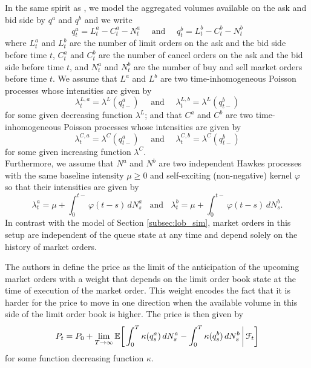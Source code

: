 \documentclass{article} %
\newcommand{\1}{\mathbbm{1}} %
\newcommand{\E}{\mathbb{E}}
\begin{document}
In the same spirit as \cite{Chahdi2024}, we  model the aggregated volumes available on the ask and bid side by $q^a$ and $q^b$ and we write
\begin{equation}
\label{eq:queue_dynamics}
q^a_t = L^{a}_t - C^{a}_t - N^{a}_t \quad \text{ and } \quad q^b_t = L^{b}_t - C^{b}_t - N^{b}_t
\end{equation}
where $L^a_t$ and $L^b_t$ are the number of limit orders on the ask and the bid side before time $t$, $C^a_t$ and $C^b_t$ are the number of cancel orders on the ask and the bid side before time $t$, and $N^a_t$ and $N^b_t$ are the number of buy and sell market orders before time $t$. We assume that $L^{a}$ and $L^{b}$ are two time-inhomogeneous Poisson processes whose intensities are given by 
\begin{equation*}
\lambda_t^{L,a} = \lambda^L(q_{t-}^{a})
\quad \text{ and } \quad 
\lambda_t^{L,b} = \lambda^L(q_{t-}^{b})
\end{equation*}
for some given decreasing function $\lambda^L$; and that $C^{a}$ and $C^{b}$ are two time-inhomogeneous Poisson processes whose intensities are given by 
\begin{equation*}
\lambda_t^{C,a} = \lambda^C(q_{t-}^{a})
\quad \text{ and } \quad 
\lambda_t^{C,b} = \lambda^C(q_{t-}^{b})
\end{equation*}
for some given increasing function $\lambda^C$.\\
Furthermore,  we assume that $N^a$ and $N^b$ are two independent Hawkes processes with the same baseline intensity $\mu \geq 0$ and self-exciting (non-negative) kernel $\varphi$ so that their intensities are given by
\begin{equation*}
\lambda^{a}_t = \mu + \int_0^{t-} \varphi(t-s) \, dN^{a}_s
\;\;\text{ and }\;\;
\lambda^{b}_t = \mu + \int_0^{t-} \varphi(t-s) \, dN^{b}_s.
\end{equation*}
In contrast with the model of Section \ref{subsec:lob_sim}, market orders in this setup are independent of the queue state at any time and depend solely on the history of market orders.

The authors in \cite{youssef2024passiveimpact} define the price as the limit of the anticipation of the upcoming market orders with a weight that depends on the limit order book state at the time of execution of the market order. This weight encodes the fact that it is harder for the price to move in one direction when the available volume in this side of the limit order book is higher. The price is then given by
\begin{equation}
\label{eq:price}
P_t = P_0 + \lim_{T\to\infty}
\E\bigg[\int_0^T \kappa(q^a_s) \, dN^a_s - \int_0^T \kappa(q^b_s) \, dN^b_s \,\bigg|\, \calF_t \bigg]
\end{equation}
for some function decreasing function $\kappa$. 
\end{document}
